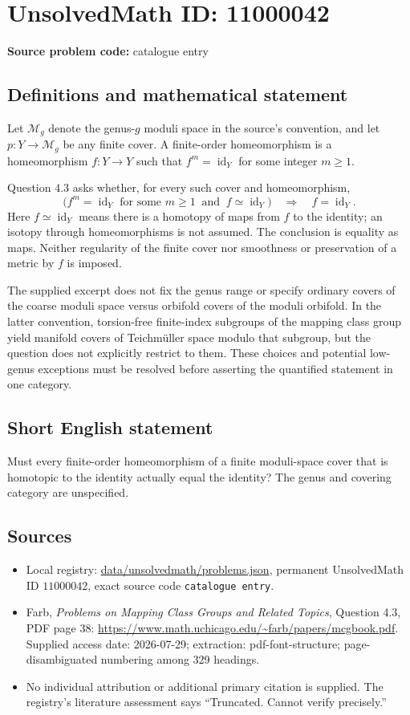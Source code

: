 \documentclass[11pt]{article}
\begin{document}
\section*{UnsolvedMath ID: 11000042}
\textbf{Source problem code:} catalogue entry
\subsection{Definitions and mathematical statement}
Let $\mathcal M_g$ denote the genus-$g$ moduli space in the source's convention, and let $p:Y\to\mathcal M_g$ be any finite cover. A finite-order homeomorphism is a homeomorphism $f:Y\to Y$ such that $f^m=\operatorname{id}_Y$ for some integer $m\geq1$.

Question 4.3 asks whether, for every such cover and homeomorphism,
\[
 \bigl(f^m=\operatorname{id}_Y\text{ for some }m\geq1
 \ \text{ and }\ f\simeq\operatorname{id}_Y\bigr)
 \quad\Longrightarrow\quad f=\operatorname{id}_Y.
\]
Here $f\simeq\operatorname{id}_Y$ means there is a homotopy of maps from $f$ to the identity; an isotopy through homeomorphisms is not assumed. The conclusion is equality as maps. Neither regularity of the finite cover nor smoothness or preservation of a metric by $f$ is imposed.

The supplied excerpt does not fix the genus range or specify ordinary covers of the coarse moduli space versus orbifold covers of the moduli orbifold. In the latter convention, torsion-free finite-index subgroups of the mapping class group yield manifold covers of Teichm\"uller space modulo that subgroup, but the question does not explicitly restrict to them. These choices and potential low-genus exceptions must be resolved before asserting the quantified statement in one category.
\subsection{Short English statement}
Must every finite-order homeomorphism of a finite moduli-space cover that is homotopic to the identity actually equal the identity? The genus and covering category are unspecified.
\subsection{Sources}
\begin{itemize}
\item Local registry: \url{data/unsolvedmath/problems.json}, permanent UnsolvedMath ID $11000042$, exact source code \texttt{catalogue entry}.
\item Farb, \emph{Problems on Mapping Class Groups and Related Topics}, Question 4.3, PDF page 38: \url{https://www.math.uchicago.edu/~farb/papers/mcgbook.pdf}. Supplied access date: 2026-07-29; extraction: pdf-font-structure; page-disambiguated numbering among 329 headings.
\item No individual attribution or additional primary citation is supplied. The registry's literature assessment says ``Truncated. Cannot verify precisely.''
\end{itemize}
\end{document}
